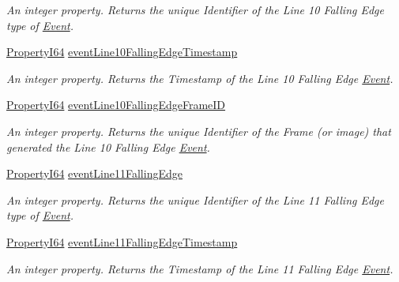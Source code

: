 \begin{DoxyCompactItemize}
\begin{DoxyCompactList}\small\item\em An integer property. Returns the unique Identifier of the Line 10 Falling Edge type of \hyperlink{classmv_i_m_p_a_c_t_1_1acquire_1_1_event}{Event}. \end{DoxyCompactList}\item 
\hyperlink{group___common_interface_ga81749b2696755513663492664a18a893}{Property\+I64} \hyperlink{classmv_i_m_p_a_c_t_1_1acquire_1_1_gen_i_cam_1_1_event_control_ac6da83280ffe3677cb1620a6e5c26691}{event\+Line10\+Falling\+Edge\+Timestamp}
\begin{DoxyCompactList}\small\item\em An integer property. Returns the Timestamp of the Line 10 Falling Edge \hyperlink{classmv_i_m_p_a_c_t_1_1acquire_1_1_event}{Event}. \end{DoxyCompactList}\item 
\hyperlink{group___common_interface_ga81749b2696755513663492664a18a893}{Property\+I64} \hyperlink{classmv_i_m_p_a_c_t_1_1acquire_1_1_gen_i_cam_1_1_event_control_abd7e167c95d7038b7a163c460e592e5c}{event\+Line10\+Falling\+Edge\+Frame\+I\+D}
\begin{DoxyCompactList}\small\item\em An integer property. Returns the unique Identifier of the Frame (or image) that generated the Line 10 Falling Edge \hyperlink{classmv_i_m_p_a_c_t_1_1acquire_1_1_event}{Event}. \end{DoxyCompactList}\item 
\hyperlink{group___common_interface_ga81749b2696755513663492664a18a893}{Property\+I64} \hyperlink{classmv_i_m_p_a_c_t_1_1acquire_1_1_gen_i_cam_1_1_event_control_a864a9482476e0495511a1061fa2883f2}{event\+Line11\+Falling\+Edge}
\begin{DoxyCompactList}\small\item\em An integer property. Returns the unique Identifier of the Line 11 Falling Edge type of \hyperlink{classmv_i_m_p_a_c_t_1_1acquire_1_1_event}{Event}. \end{DoxyCompactList}\item 
\hyperlink{group___common_interface_ga81749b2696755513663492664a18a893}{Property\+I64} \hyperlink{classmv_i_m_p_a_c_t_1_1acquire_1_1_gen_i_cam_1_1_event_control_a6bdcb1ec1cceb945772d0682418b7e01}{event\+Line11\+Falling\+Edge\+Timestamp}
\begin{DoxyCompactList}\small\item\em An integer property. Returns the Timestamp of the Line 11 Falling Edge \hyperlink{classmv_i_m_p_a_c_t_1_1acquire_1_1_event}{Event}. \end{DoxyCompactList}\item 

\end{DoxyCompactItemize}
